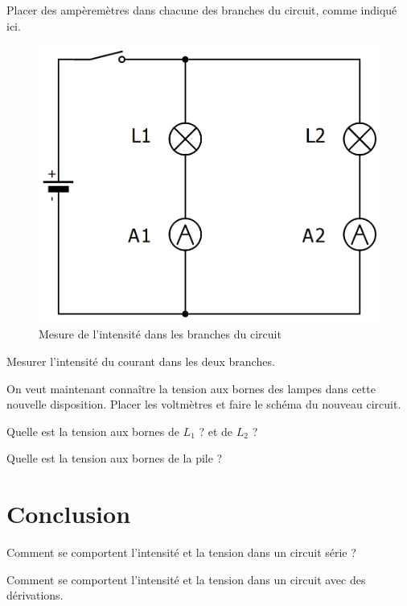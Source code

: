 \documentclass[a4paper,11pt]{exam}
\begin{document}
\begin{questions}
	
	
	\question Placer des ampèremètres dans chacune des branches du circuit, comme indiqué ici.
		
	\begin{figure}[h!]
		\label{fig:intensite_drv}
		\begin{center}
			\includegraphics[scale=0.2]{img/intensite_drv}
		\end{center}
	
		
		\caption{Mesure de l'intensité dans les branches du circuit}
	\end{figure}
	
	\question Mesurer l'intensité du courant dans les deux branches.
	
	\fillwithdottedlines{2cm}
	
	\newpage
	\question On veut maintenant connaître la tension aux bornes des lampes dans cette nouvelle disposition. Placer les voltmètres et faire le schéma du nouveau circuit.
	\makeemptybox{7cm}
	
	\question Quelle est la tension aux bornes de $L_1$ ? et de $L_2$ ?
	\fillwithdottedlines{2cm}
	
	\question Quelle est la tension aux bornes de la pile ?
	\fillwithdottedlines{2cm}
	
\end{questions}

\section{Conclusion}

\begin{questions}
	\question Comment se comportent l'intensité et la tension dans un circuit série ?
	\fillwithdottedlines{3.5cm}	
	
	\question Comment se comportent l'intensité et la tension dans un circuit avec des dérivations.
	\fillwithdottedlines{3.5cm}
\end{questions}\label{LastPage}
\end{document}
